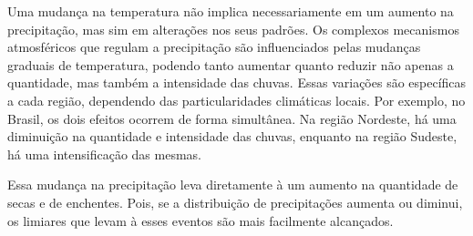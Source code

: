 Uma mudança na temperatura não implica necessariamente em um aumento na precipitação, mas sim em alterações nos seus
padrões. Os complexos mecanismos atmosféricos que regulam a precipitação são influenciados pelas mudanças graduais de
temperatura, podendo tanto aumentar quanto reduzir não apenas a quantidade, mas também a intensidade das chuvas. Essas
variações são específicas a cada região, dependendo das particularidades climáticas locais. Por exemplo, no Brasil, os
dois efeitos ocorrem de forma simultânea. Na região Nordeste, há uma diminuição na quantidade e intensidade das chuvas,
enquanto na região Sudeste, há uma intensificação das mesmas.  

Essa mudança na precipitação leva diretamente à um aumento na quantidade de secas e de enchentes. Pois, se a
distribuição de precipitações aumenta ou diminui, os limiares que levam à esses eventos são mais facilmente alcançados. 





